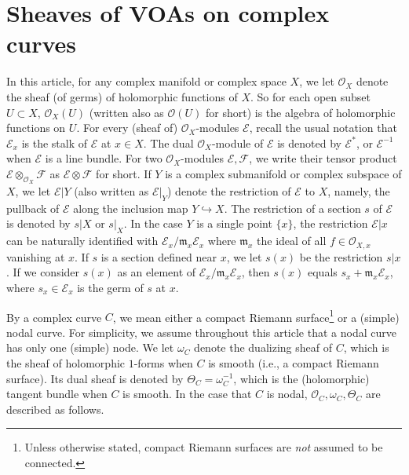 \documentclass[12pt,a4paper,notitlepage]{article}
\theoremstyle{definition}
\theoremstyle{plain}
\newcommand{\fk}{\mathfrak}
\newcommand{\scr}{\mathscr}
\numberwithin{equation}{section}
\begin{document}
\section{Sheaves of VOAs on complex curves}\label{lb5}



In this article, for any complex manifold or complex space $X$, we let $\scr O_X$ denote the sheaf (of germs) of holomorphic functions of $X$. So for each open subset $U\subset X$, $\scr O_X(U)$ (written also as $\scr O(U)$ for short) \index{OX@$\scr O_X,\scr O(U)$} is the algebra of holomorphic functions on $U$. For every (sheaf of) $\scr O_X$-modules $\scr E$, recall the usual notation that $\scr E_x$ \index{Ex@$\scr E_x$} is the stalk of $\scr E$ at $x\in X$. The dual $\scr O_X$-module of $\scr E$ is denoted by $\scr E^*$, or $\scr E^{-1}$ when $\scr E$ is a line bundle. For two $\scr O_X$-modules $\scr E,\scr F$, we write their tensor product $\scr E\otimes_{\scr O_X}\scr F$ as $\scr E\otimes\scr F$ for short. If $Y$ is a complex submanifold or complex subspace of $X$, we let $\scr E|Y$ (also written as $\scr E|_Y$) denote the restriction of $\scr E$ to $X$, namely, the pullback of $\scr E$ along the inclusion map $Y\hookrightarrow X$. \index{EY@$\scr E\lvert Y=\scr E\lvert_Y,\scr E\lvert x$} The restriction of a section $s$ of $\scr E$ is denoted by $s|X$ or $s|_X$. In the case $Y$ is a single point $\{x\}$, the restriction $\scr E|x$ can be naturally identified with $\scr E_x/\fk m_x\scr E_x$ where $\fk m_x$ the  ideal of all $f\in\scr O_{X,x}$ vanishing at $x$. If $s$ is a section defined near $x$, we let $s(x)$ be the restriction $s|x$. If we consider $s(x)$ as an element of $\scr E_x/\fk m_x\scr E_x$, then $s(x)$ equals $s_x+\fk m_x\scr E_x$, where $s_x\in\scr E_x$ is the germ of $s$ at $x$.

By a complex curve $C$, we mean  either a compact Riemann surface\footnote{Unless otherwise stated, compact Riemann surfaces are \emph{not} assumed to be connected.} or a (simple) nodal curve. For simplicity, we assume throughout this article that a nodal curve has only one (simple) node. We let $\omega_C$ denote the dualizing sheaf of $C$, which is the sheaf of holomorphic $1$-forms when $C$ is smooth (i.e., a compact Riemann surface).  Its dual sheaf is denoted by $\Theta_C=\omega_C^{-1}$, which is the (holomorphic) tangent bundle when $C$ is smooth. In the case that $C$ is nodal, $\scr O_C,\omega_C,\Theta_C$ are described as follows.
\end{document}

